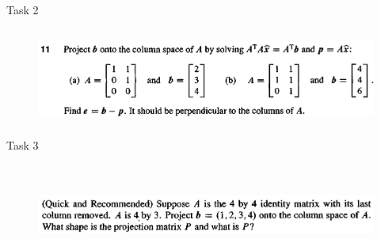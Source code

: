 \documentclass[aspectratio=169]{beamer}
\begin{document}
    \begin{frame}[t]{Task 2}
        \framesubtitle{}
        \begin{figure}[H]
            \centering\includegraphics[height=3cm,width=1\textwidth,keepaspectratio]{2.png}
            \label{fig:2.png}
        \end{figure}
    \end{frame}

    \begin{frame}[t]{Task 3}
        \framesubtitle{}
        \begin{figure}[H]
            \centering\includegraphics[height=3cm,width=1\textwidth,keepaspectratio]{3.png}
            \label{fig:3.png}
        \end{figure}
    \end{frame}
\end{document}
